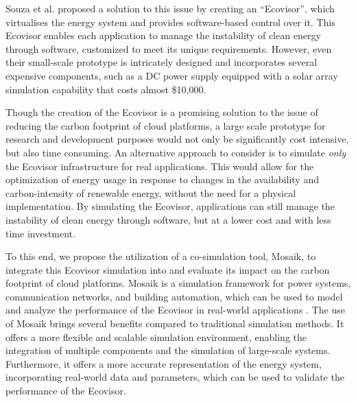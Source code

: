 Souza et al. \cite{souza2023} proposed a solution to this issue by creating an
\enquote{Ecovisor}, which virtualises the energy system and provides
software-based control over it. This Ecovisor enables each application to manage
the instability of clean energy through software, customized to meet its unique
requirements. However, even their small-scale prototype is intricately designed
and incorporates several expensive components, such as a DC power supply
equipped with a solar array simulation capability that costs almost \$10,000.

Though the creation of the Ecovisor is a promising solution to the issue of
reducing the carbon footprint of cloud platforms, a large scale prototype for
research and development purposes would not only be significantly cost
intensive, but also time consuming. An alternative approach to consider is to
simulate \emph{only} the Ecovisor infrastructure for real applications. This
would allow for the optimization of energy usage in response to changes in the
availability and carbon-intensity of renewable energy, without the need for a
physical implementation. By simulating the Ecovisor, applications can still
manage the instability of clean energy through software, but at a lower cost and
with less time investment. \medskip

To this end, we propose the utilization of a co-simulation tool, Mosaik, to
integrate this Ecovisor simulation into and evaluate its impact on the carbon
footprint of cloud platforms. Mosaik is a simulation framework for power
systems, communication networks, and building automation, which can be used to
model and analyze the performance of the Ecovisor in real-world applications
\cite{steinbrink2019}. The use of Mosaik brings several benefits compared to
traditional simulation methods. It offers a more flexible and scalable
simulation environment, enabling the integration of multiple components and the
simulation of large-scale systems. Furthermore, it offers a more accurate
representation of the energy system, incorporating real-world data and
parameters, which can be used to validate the performance of the Ecovisor.

